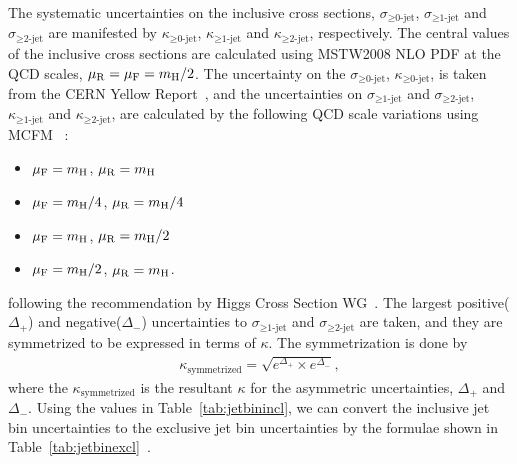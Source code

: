 The systematic uncertainties on the inclusive cross sections, 
$\sigma_{\ge\textrm{0-jet}}$, $\sigma_{\ge\textrm{1-jet}}$ and $\sigma_{\ge\textrm{2-jet}}$ are 
manifested by $\kappa_{\ge\textrm{0-jet}}$, $\kappa_{\ge\textrm{1-jet}}$ and $\kappa_{\ge\textrm{2-jet}}$, respectively.
The central values of the inclusive cross sections are calculated 
using MSTW2008 NLO PDF at the QCD scales, $\mu_\mathrm{R}=\mu_\mathrm{F}=m_{\mathrm{H}}/2$.
The uncertainty on the $\sigma_{\ge\textrm{0-jet}}$, $\kappa_{\ge\textrm{0-jet}}$, is taken from the 
CERN Yellow Report~\cite{Dittmaier:1318996}, and the uncertainties 
on $\sigma_{\ge\textrm{1-jet}}$ and $\sigma_{\ge\textrm{2-jet}}$, 
$\kappa_{\ge\textrm{1-jet}}$ and $\kappa_{\ge\textrm{2-jet}}$, are 
calculated by the following QCD scale variations using MCFM~\cite{Campbell:2010ff} : 
\begin{itemize}
\item $\mu_\mathrm{F} = m_{\mathrm{H}} $, $\mu_\mathrm{R} = m_{\mathrm{H}}$
\item $\mu_\mathrm{F} = m_{\mathrm{H}} / 4$, $\mu_\mathrm{R} = m_{\mathrm{H}} / 4$
\item $\mu_\mathrm{F} = m_{\mathrm{H}} $, $\mu_\mathrm{R} = m_{\mathrm{H}} / 2$
\item $\mu_\mathrm{F} = m_{\mathrm{H}} / 2$, $\mu_\mathrm{R}= m_{\mathrm{H}}$.
\end{itemize}
following the recommendation by Higgs Cross Section WG~\cite{Dittmaier:2012vm}. 
The largest positive($\Delta_{+}$) and negative($\Delta_{-}$) uncertainties 
to $\sigma_{\ge\textrm{1-jet}}$ and $\sigma_{\ge\textrm{2-jet}}$ are taken,
and they are symmetrized to be expressed in terms of $\kappa$. 
The symmetrization is done by 
\begin{eqnarray} 
  \kappa_{\mathrm{symmetrized}} = \sqrt{e^{\Delta_{+}} \times e^{\Delta_{-}}} ,
\end{eqnarray} 
where the $\kappa_{\mathrm{symmetrized}}$ is the resultant $\kappa$
for the asymmetric uncertainties, $\Delta_{+}$ and $\Delta_{-}$.
Using the values in Table~\ref{tab:jetbinincl}, we can convert the inclusive jet bin 
uncertainties to the exclusive jet bin uncertainties by the formulae shown in 
Table~\ref{tab:jetbinexcl}~\cite{Dittmaier:2012vm}.

